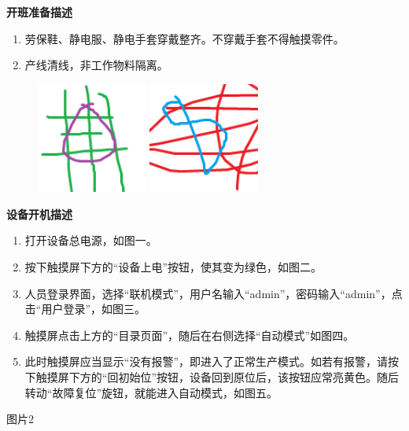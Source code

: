 \documentclass[UTF8]{ctexart}
\newcommand{\smalltitle}[1]{{\zihao{4}\bfseries{#1}}\\}
\begin{document}
\centering
\begin{boxedminipage}{184.6mm}
\centering
\smalltitle{开班准备描述}
\begin{boxedminipage}[t]{99.84mm}
\begin{enumerate}
\item 劳保鞋、静电服、静电手套穿戴整齐。不穿戴手套不得触摸零件。
\item 产线清线，非工作物料隔离。
\end{enumerate}
\end{boxedminipage}
\hfill
\begin{boxedminipage}[t]{76.76mm}
\begin{figure}[H]
\parbox[t]{36.38mm}{
\includegraphics[width=36.38mm]{pic01}
\caption{}}
\hfill
\parbox[t]{36.38mm}{
\includegraphics[width=36.38mm]{pic02}
\caption{}}
\end{figure}
\end{boxedminipage}
\end{boxedminipage}

\begin{boxedminipage}{184.6mm}
\centering
\smalltitle{设备开机描述}
\begin{boxedminipage}[t]{99.84mm}
\begin{enumerate}
\item 打开设备总电源，如图一。
\item 按下触摸屏下方的“设备上电”按钮，使其变为绿色，如图二。
\item 人员登录界面，选择“联机模式”，用户名输入“admin”，密码输入“admin”，点击“用户登录”，如图三。
\item 触摸屏点击上方的“目录页面”，随后在右侧选择“自动模式”如图四。
\item 此时触摸屏应当显示“没有报警”，即进入了正常生产模式。如若有报警，请按下触摸屏下方的“回初始位”按钮，设备回到原位后，该按钮应常亮黄色。随后转动“故障复位”旋钮，就能进入自动模式，如图五。
\end{enumerate}
\end{boxedminipage}
\hfill
\begin{boxedminipage}[t]{76.76mm}
图片2
\end{boxedminipage}
\end{boxedminipage}
\end{document}
